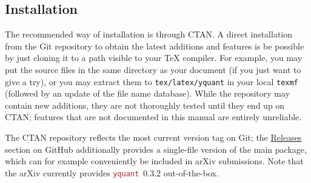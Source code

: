 \documentclass{scrartcl}
\def\pkg#1{\textcolor{brown}{\texttt{#1}}}
\def\Yquant{\pkg{yquant}}
\begin{document}
      \subsection{Installation}
         The recommended way of installation is through CTAN.
         A direct installation from the Git repository to obtain the latest additions and features is be possible by just cloning it to a path visible to your \TeX{} compiler.
         For example, you may put the source files in the same directory as your document (if you just want to give a try), or you may extract them to \texttt{tex/latex/yquant} in your local \texttt{texmf} (followed by an update of the file name database).
         While the repository may contain new additions, they are not thoroughly tested until they end up on CTAN; features that are not documented in this manual are entirely unreliable.

         The CTAN repository reflects the most current version tag on Git; the \href{https://github.com/projekter/yquant/releases}{Releases} section on GitHub additionally provides a single\hyp file version of the main package, which can for example conveniently be included in arXiv submissions.
         Note that the arXiv currently provides \Yquant{}~0.3.2 out\hyp of\hyp the\hyp box.
\end{document}
